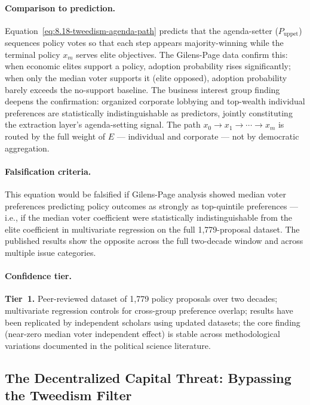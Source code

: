 \paragraph{Comparison to prediction.}
Equation~\ref{eq:8.18-tweedism-agenda-path} predicts that the agenda-setter ($P_{\text{uppet}}$) sequences policy votes so that each step appears majority-winning while the terminal policy $x_m$ serves elite objectives. The Gilens-Page data confirm this: when economic elites support a policy, adoption probability rises significantly; when only the median voter supports it (elite opposed), adoption probability barely exceeds the no-support baseline. The business interest group finding deepens the confirmation: organized corporate lobbying and top-wealth individual preferences are statistically indistinguishable as predictors, jointly constituting the extraction layer's agenda-setting signal. The path $x_0 \rightarrow x_1 \rightarrow \cdots \rightarrow x_m$ is routed by the full weight of $E$ --- individual and corporate --- not by democratic aggregation.

\paragraph{Falsification criteria.}
This equation would be falsified if Gilens-Page analysis showed median voter preferences predicting policy outcomes as strongly as top-quintile preferences --- i.e., if the median voter coefficient were statistically indistinguishable from the elite coefficient in multivariate regression on the full 1,779-proposal dataset. The published results show the opposite across the full two-decade window and across multiple issue categories.

\paragraph{Confidence tier.}
\textbf{Tier~1.} Peer-reviewed dataset of 1,779 policy proposals over two decades; multivariate regression controls for cross-group preference overlap; results have been replicated by independent scholars using updated datasets; the core finding (near-zero median voter independent effect) is stable across methodological variations documented in the political science literature.

\subsection{The Decentralized Capital Threat: Bypassing the Tweedism Filter}

